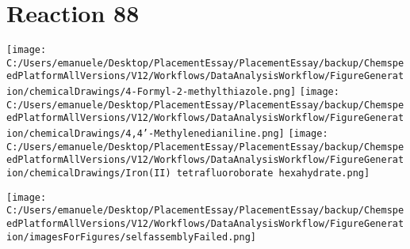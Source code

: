 \documentclass{article}%
\begin{document}
\section*{Reaction 88}%
%
\begin{scheme}[H]%
\begin{minipage}{0.5\textwidth}%
\texttt{[image: C:/Users/emanuele/Desktop/PlacementEssay/PlacementEssay/backup/ChemspeedPlatformAllVersions/V12/Workflows/DataAnalysisWorkflow/FigureGeneration/chemicalDrawings/4-Formyl-2-methylthiazole.png]}%
\texttt{[image: C:/Users/emanuele/Desktop/PlacementEssay/PlacementEssay/backup/ChemspeedPlatformAllVersions/V12/Workflows/DataAnalysisWorkflow/FigureGeneration/chemicalDrawings/4,4'-Methylenedianiline.png]}%
\texttt{[image: C:/Users/emanuele/Desktop/PlacementEssay/PlacementEssay/backup/ChemspeedPlatformAllVersions/V12/Workflows/DataAnalysisWorkflow/FigureGeneration/chemicalDrawings/Iron(II) tetrafluoroborate hexahydrate.png]}%
\end{minipage}%
\begin{minipage}{0.5\textwidth}%
\begin{center}%
\texttt{[image: C:/Users/emanuele/Desktop/PlacementEssay/PlacementEssay/backup/ChemspeedPlatformAllVersions/V12/Workflows/DataAnalysisWorkflow/FigureGeneration/imagesForFigures/selfassemblyFailed.png]}%
\end{center}%
\end{minipage}%
\caption{Self-assembly of components 1, 17, with Iron(II) in a 3.0:1.5:1.0 molar ratio in CH$_3$CN at 60\textdegree C for 40h. These are the reagents (starting materials) for reaction 88.}%
\end{scheme}%
\end{document}
